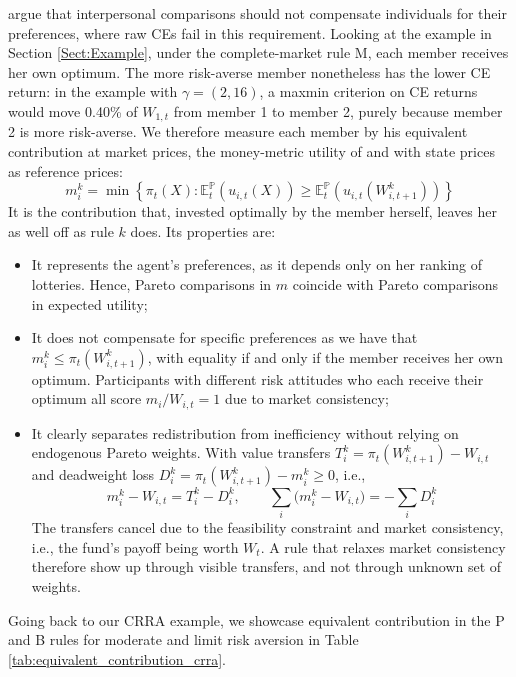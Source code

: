 \documentclass[11pt,a4paper]{article}
\theoremstyle{definition}
\theoremstyle{plain}
\theoremstyle{remark}
\newcommand{\E}{\mathbb{E}}
\renewcommand{\P}{\mathbb{P}}
\newcommand{\1}{\mathbf{1}}
\begin{document}
\citet{FleurbaeyManiquet2011} argue that interpersonal comparisons should not compensate individuals for their preferences, where raw CEs fail in this requirement. Looking at the example in Section \ref{Sect:Example}, under the complete-market rule M, each member receives her own optimum. The more risk-averse member nonetheless has the lower CE return: in the example with $\gamma=(2,16)$, a maxmin criterion on CE returns would move 0.40\% of $W_{1,t}$ from member 1 to member 2, purely because member 2 is more risk-averse. We therefore measure each member by his equivalent contribution at market prices, the money-metric utility of \citet{McKenzie1957} and \citet{Samuelson1974} with state prices as reference prices:
\begin{equation}
    m_i^k = \min\left\{ \pi_t(X): \E_t^\P(u_{i,t}(X)) \geq \E_t^{\P}(u_{i,t}(W_{i,t+1}^k)) \right\}
\end{equation}
It is the contribution that, invested optimally by the member herself, leaves her as well off as rule $k$ does. Its properties are:
\begin{itemize}
    \item It represents the agent's preferences, as it depends only on her ranking of lotteries. Hence, Pareto comparisons in $m$ coincide with Pareto comparisons in expected utility;
    \item It does not compensate for specific preferences as we have that $m_i^k \leq \pi_t(W_{i,t+1}^k)$, with equality if and only if the member receives her own optimum. Participants with different risk attitudes who each receive their optimum all score $m_i/W_{i,t} = 1$ due to market consistency;
    \item It clearly separates redistribution from inefficiency without relying on endogenous Pareto weights. With value transfers $T_i^k = \pi_t(W_{i,t+1}^k) - W_{i,t}$ and deadweight loss $D_i^k = \pi_t(W_{i,t+1}^k) - m_i^k \geq 0$, i.e.,
    \begin{equation*}
        m^k_i-W_{i,t}=T^k_i-D^k_i,\qquad \sum_i\big(m^k_i-W_{i,t}\big)=-\sum_i D^k_i
    \end{equation*}
    The transfers cancel due to the feasibility constraint and market consistency, i.e., the fund's payoff being worth $W_t$. A rule that relaxes market consistency therefore show up through visible transfers, and not through unknown set of weights.
\end{itemize}
Going back to our CRRA example, we showcase equivalent contribution in the P and B rules for moderate and limit risk aversion in Table \ref{tab:equivalent_contribution_crra}.
\end{document}
